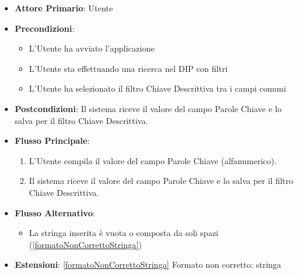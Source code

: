\label{addValoreParoleChiave}
\begin{itemize}
      \item \textbf{Attore Primario}: Utente
      \item \textbf{Precondizioni}: 
      \begin{itemize}
            \item L'Utente ha avviato l'applicazione
            \item L'Utente sta effettuando una ricerca nel DIP con filtri
            \item L'Utente ha selezionato il filtro Chiave Descrittiva tra i campi comuni
      \end{itemize}
      \item \textbf{Postcondizioni}: Il sistema riceve il valore del campo Parole Chiave e lo salva per il filtro Chiave Descrittiva.
      \item \textbf{Flusso Principale}:
      \begin{enumerate}
            \item L'Utente compila il valore del campo Parole Chiave (alfanumerico).
            \item Il sistema riceve il valore del campo Parole Chiave e lo salva per il filtro Chiave Descrittiva.
      \end{enumerate}
      \item \textbf{Flusso Alternativo}:
      \begin{itemize}
            \item La stringa inserita è vuota o composta da soli spazi (\ref{formatoNonCorrettoStringa})
      \end{itemize}
      \item \textbf{Estensioni}: \ref{formatoNonCorrettoStringa} Formato non corretto: stringa
\end{itemize}

